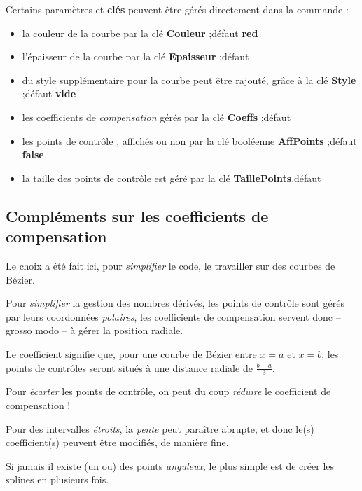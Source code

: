 \documentclass[a4paper,french,11pt]{article}
\newcommand\ctex[1]{\tcbox[vignettelatex]{#1}}
\newcommand\Cle[1]{{\bfseries\sffamily\textlangle #1\textrangle}}
\begin{document}
\begin{cautionblock}
Certains paramètres et \Cle{clés} peuvent être gérés directement dans la commande \ctex{splinetikz} :
%
\begin{itemize}
	\item la couleur de la courbe par la {clé} \Cle{Couleur} ;\hfill{}défaut \Cle{red}
	\item l'épaisseur de la courbe par la {clé} \Cle{Epaisseur} ;\hfill{}défaut \Cle{1.25pt}
	\item du style supplémentaire pour la courbe peut être rajouté, grâce à la {clé} \Cle{Style} ;\hfill{}défaut \Cle{vide}
	\item les coefficients de \textit{compensation} gérés par la {clé} \Cle{Coeffs} ;\hfill{}défaut \Cle{3}
	\item les points de contrôle , affichés ou non par la {clé booléenne} \Cle{AffPoints} ;\hfill{}défaut \Cle{false}
	\item la taille des points de contrôle est géré par la {clé} \Cle{TaillePoints}.\hfill{}défaut \Cle{2pt}
\end{itemize}
\vspace*{-\baselineskip}\leavevmode
\end{cautionblock}

\subsection{Compléments sur les coefficients de \og compensation \fg}

\begin{tipblock}
Le choix a été fait ici, pour \textit{simplifier} le code, le travailler sur des courbes de Bézier.

Pour \textit{simplifier} la gestion des nombres dérivés, les points de contrôle sont gérés par leurs coordonnées \textit{polaires}, les \textsf{coefficients de compensation} servent donc -- grosso modo -- à gérer la position radiale.

\smallskip

Le coefficient \Cle{3} signifie que, pour une courbe de Bézier entre $x=a$ et $x=b$, les points de contrôles seront situés à une distance radiale de $\frac{b-a}{3}$.

Pour \textit{écarter} les points de contrôle, on peut du coup \textit{réduire} le coefficient de compensation !

\medskip

Pour des intervalles \textit{étroits}, la \textit{pente} peut paraître abrupte, et donc le(s) coefficient(s) peuvent être modifiés, de manière fine.

\medskip

Si jamais il existe (un ou) des points \textit{anguleux}, le plus simple est de créer les splines en plusieurs fois.
\end{tipblock}
\end{document}
